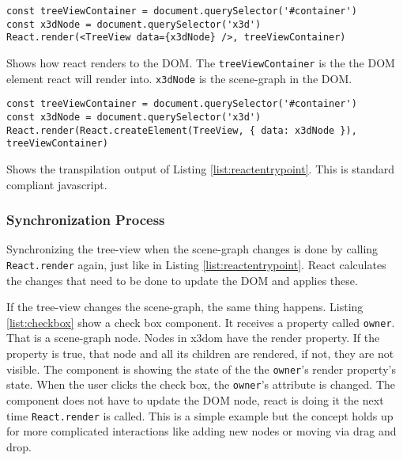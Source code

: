 \begin{listing}
  \begin{verbatim}
const treeViewContainer = document.querySelector('#container')
const x3dNode = document.querySelector('x3d')
React.render(<TreeView data={x3dNode} />, treeViewContainer)
  \end{verbatim}
  \caption{Shows how react renders to the \gls{DOM}. The \texttt{treeViewContainer} is the the \gls{DOM} element react will render into. \texttt{x3dNode} is the scene-graph in the \gls{DOM}.}
  \label{list:reactentrypoint}
\end{listing}

\begin{listing}
  \begin{verbatim}
const treeViewContainer = document.querySelector('#container')
const x3dNode = document.querySelector('x3d')
React.render(React.createElement(TreeView, { data: x3dNode }), treeViewContainer)
  \end{verbatim}
  \caption{Shows the transpilation output of Listing \ref{list:reactentrypoint}. This is standard compliant javascript.}
  \label{list:reacttranspiled}
\end{listing}

\subsubsection{Synchronization Process}
\label{synchronization-process}

Synchronizing the tree-view when the scene-graph changes is done by calling
\texttt{React.render} again, just like in Listing \ref{list:reactentrypoint}. React
calculates the changes that need to be done to update the \gls{DOM} and applies these.

If the tree-view changes the scene-graph, the same thing happens. Listing
\ref{list:checkbox} show a check box component. It receives a property called
\texttt{owner}. That is a scene-graph node. Nodes in x3dom have the render
property. If the property is true, that node and all its children are rendered,
if not, they are not visible. The component is showing the state of the the
\texttt{owner}'s render property's state. When the user clicks the check box, the
\texttt{owner}'s attribute is changed. The component does not have to update the
\gls{DOM} node, react is doing it the next time \texttt{React.render} is called. This
is a simple example but the concept holds up for more complicated interactions
like adding new nodes or moving via drag and drop.

